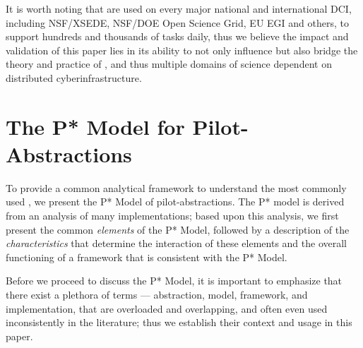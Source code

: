 \documentclass{sig-alternate}
\begin{document}

It is worth noting that \pilotjobs are used on every major
national and international DCI, including NSF/XSEDE,
NSF/DOE Open Science Grid, EU EGI and others, to support hundreds and
thousands of tasks daily, thus we believe the impact and validation of
this paper lies in its ability to not only influence but also bridge
the theory and practice of \pilotjobs, and thus multiple domains of
science dependent on distributed cyberinfrastructure.








\section{The P* Model for Pilot-\\Abstractions}
\label{sec:pilot-model}


To provide a common analytical framework to understand the most
commonly used \pilotjobs, we present the P* Model of
pilot-abstractions. The P* model is derived from an analysis of many
\pilotjob implementations; based upon this analysis, we first present
the common {\it elements} of the P* Model, followed by a description
of the {\it characteristics} that determine the interaction of these
elements and the overall functioning of a \pilotjob framework that is
consistent with the P* Model.


 
Before we proceed to discuss the P* Model, it is important to
emphasize that there exist a plethora of terms --- abstraction, model,
framework, and implementation, that are overloaded and overlapping,
and often even used inconsistently in the literature; thus we
establish their context and usage in this paper.
\end{document}
